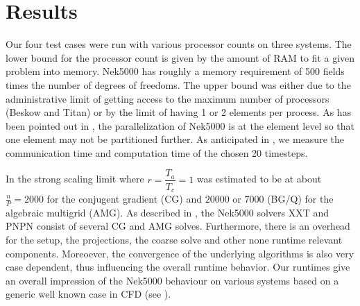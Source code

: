 \documentclass{sig-alternate}
\begin{document}
\section{Results}

Our four test cases were run with various processor counts on three systems. The
lower bound for the processor count is given by the amount of RAM to fit a given
problem into memory. Nek5000 has roughly a memory requirement of 500 fields
times the number of degrees of freedoms. The upper bound was either due to the
administrative limit of getting access to the maximum number of processors
(Beskow and Titan) or by the limit of having 1 or 2 elements per process. As has
been pointed out in , the parallelization of Nek5000 is at the
element level so that one element may not be partitioned further. 
As anticipated in , we measure the communication time and
computation time of the chosen 20 timesteps. 

In \cite{fischer:scaling} the strong scaling limit where $r=\dfrac{T_a}{T_c}=1$ was estimated
to be at about $\frac{n}{P}=2000$ for the conjugent gradient (CG) and $20000$ or
$7000$ (BG/Q) for the algebraic multigrid (AMG). As described in , the
Nek5000 solvers XXT and PNPN consist of several CG and AMG solves. Furthermore,
there is an overhead for the setup, the projections, the coarse solve and other
none runtime relevant components. Moreoever, the convergence of the underlying
algorithms is also very case dependent, thus influencing the overall runtime
behavior. Our runtimes give an overall impression of the Nek5000 behaviour on
various systems based on a generic well known case in CFD (see
). 
\end{document}

